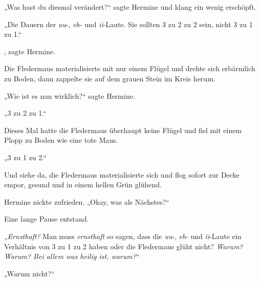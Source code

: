 „Was hast du diesmal verändert?“ sagte Hermine und klang ein wenig erschöpft.

„Die Dauern der \emph{uu}-, \emph{eh}- und \emph{ii}-Laute. Sie sollten 3 zu 2 zu 2 sein, nicht 3 zu 1 zu 1.“

, sagte Hermine.

Die Fledermaus materialisierte mit nur einem Flügel und drehte sich erbärmlich zu Boden, dann zappelte sie auf dem grauen Stein im Kreis herum.

„Wie ist es nun wirklich?“ sagte Hermine.

„3 zu 2 zu 1.“


Dieses Mal hatte die Fledermaus überhaupt keine Flügel und fiel mit einem Plopp zu Boden wie eine tote Maus.

„3 zu 1 zu 2.“

Und siehe da, die Fledermaus materialisierte sich und flog sofort zur Decke empor, gesund und in einem hellen Grün glühend.

Hermine nickte zufrieden.
„Okay, was als Nächstes?“

Eine lange Pause entstand.

„\emph{Ernsthaft?} Man muss \emph{ernsthaft} so  sagen, dass die \emph{uu}-, \emph{eh}- und \emph{ii}-Laute ein Verhältnis von 3 zu 1 zu 2 haben oder die Fledermaus glüht nicht? \emph{Warum? Warum? Bei allem was heilig ist, warum?}“

„Warum nicht?“

